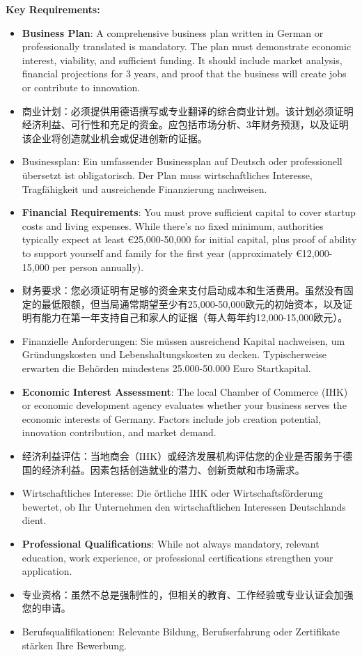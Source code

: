 \textbf{Key Requirements:}
\begin{itemize}
    \item \textbf{Business Plan}: A comprehensive business plan written in German or professionally translated is mandatory. The plan must demonstrate economic interest, viability, and sufficient funding. It should include market analysis, financial projections for 3 years, and proof that the business will create jobs or contribute to innovation.
    \item 商业计划：必须提供用德语撰写或专业翻译的综合商业计划。该计划必须证明经济利益、可行性和充足的资金。应包括市场分析、3年财务预测，以及证明该企业将创造就业机会或促进创新的证据。
    \item Businessplan: Ein umfassender Businessplan auf Deutsch oder professionell übersetzt ist obligatorisch. Der Plan muss wirtschaftliches Interesse, Tragfähigkeit und ausreichende Finanzierung nachweisen.
    
    \item \textbf{Financial Requirements}: You must prove sufficient capital to cover startup costs and living expenses. While there's no fixed minimum, authorities typically expect at least €25,000-50,000 for initial capital, plus proof of ability to support yourself and family for the first year (approximately €12,000-15,000 per person annually).
    \item 财务要求：您必须证明有足够的资金来支付启动成本和生活费用。虽然没有固定的最低限额，但当局通常期望至少有25,000-50,000欧元的初始资本，以及证明有能力在第一年支持自己和家人的证据（每人每年约12,000-15,000欧元）。
    \item Finanzielle Anforderungen: Sie müssen ausreichend Kapital nachweisen, um Gründungskosten und Lebenshaltungskosten zu decken. Typischerweise erwarten die Behörden mindestens 25.000-50.000 Euro Startkapital.
    
    \item \textbf{Economic Interest Assessment}: The local Chamber of Commerce (IHK) or economic development agency evaluates whether your business serves the economic interests of Germany. Factors include job creation potential, innovation contribution, and market demand.
    \item 经济利益评估：当地商会（IHK）或经济发展机构评估您的企业是否服务于德国的经济利益。因素包括创造就业的潜力、创新贡献和市场需求。
    \item Wirtschaftliches Interesse: Die örtliche IHK oder Wirtschaftsförderung bewertet, ob Ihr Unternehmen den wirtschaftlichen Interessen Deutschlands dient.
    
    \item \textbf{Professional Qualifications}: While not always mandatory, relevant education, work experience, or professional certifications strengthen your application.
    \item 专业资格：虽然不总是强制性的，但相关的教育、工作经验或专业认证会加强您的申请。
    \item Berufsqualifikationen: Relevante Bildung, Berufserfahrung oder Zertifikate stärken Ihre Bewerbung.
\end{itemize}

